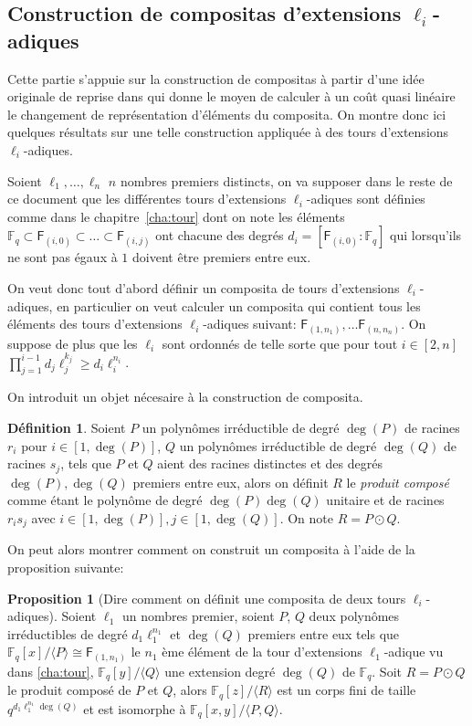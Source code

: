 \documentclass[10pt,a4paper]{book}
\theoremstyle{plain}
\theoremstyle{definition}
\theoremstyle{definition}
\theoremstyle{definition}
\newtheorem{prop}[thm]{Proposition}
\theoremstyle{definition}
\newtheorem{defi}[thm]{Définition}
\theoremstyle{remark}
\theoremstyle{remark}
\theoremstyle{definition}
\begin{document}
\subsection{Construction de compositas d'extensions $\ell_i$-adiques}
\label{sub:con:com}

Cette partie s'appuie sur la construction de compositas à partir d'une idée 
originale de \cite{BrawleyCarlitz87} reprise dans
\cite{DeFeoDoliskaniSchost14} qui donne le moyen de calculer à un coût quasi 
linéaire le changement de représentation d'éléments du composita. On montre 
donc ici quelques résultats sur une telle construction appliquée à des tours 
d'extensions $\ell_i$-adiques.

Soient $\ell_1, \dots, \ell_n$ $n$ nombres premiers distincts, 
on va supposer dans le reste de ce document que les différentes tours 
d'extensions $\ell_i$-adiques sont définies comme dans le 
chapitre~\ref{cha:tour} dont on note les éléments 
$\mathbb{F}_q \subset \mathsf{F}_{(i,0)} \subset \dots \subset  \mathsf{F}_{(i,j)}$ 
ont chacune des degrés $d_i=[\mathsf{F}_{(i,0)}:\mathbb{F}_q]$ qui lorsqu'ils 
ne sont pas égaux à $1$ doivent être premiers entre eux.

On veut donc tout d'abord définir un composita de tours d'extensions 
$\ell_i$-adiques, en particulier on veut calculer un composita qui contient 
tous les éléments des tours d'extensions $\ell_i$-adiques suivant:
$\mathsf{F}_{(1,n_1)}, \dots \mathsf{F}_{(n,n_n)}$. On suppose de plus que les
$\ell_i$ sont ordonnés de telle sorte que pour tout $i \in [2,n]$ 
$\prod_{j=1}^{i-1}d_j\ell_j^{k_j} \geqslant d_i\ell_i^{n_i}$.

On introduit un objet nécesaire à la construction de composita.
\begin{defi}
Soient $P$ un polynômes irréductible de degré $\deg(P)$ de racines $r_i$ pour 
$i \in [1,\deg(P)]$, $Q$ un polynômes irréductible de degré $\deg(Q)$ de racines $s_j$,
tels que $P$ et $Q$ aient des racines distinctes et des degrés $\deg(P),\deg(Q)$ 
premiers entre eux, alors on définit $R$ le \emph{produit composé} comme étant 
le polynôme de degré $\deg(P)\deg(Q)$ unitaire et de racines $r_is_j$ avec $i \in 
[1,\deg(P)], j \in [1,\deg(Q)]$. On note $R= P\odot Q$.  
\end{defi}
On peut alors montrer comment on construit un composita à l'aide de la 
proposition suivante: 
\begin{prop}[Dire comment on définit une composita de deux tours $\ell_i$-adiques]
\label{pro:init:com}
Soient $\ell_1$ un nombres premier, soient $P$, $Q$ deux 
polynômes irréductibles de degré $d_1\ell_1^{n_1}$ et $\deg(Q)$ 
premiers entre eux tels que $\mathbb{F}_q[x]/\langle P \rangle \cong 
\mathsf{F}_{(1,n_1)}$ le $n_1$ ème élément de la tour d'extensions 
$\ell_1$-adique vu dans \ref{cha:tour}, $\mathbb{F}_q[y]/\langle Q \rangle$ 
une extension degré $\deg(Q)$ de $\mathbb{F}_q$.
 Soit $R=P\odot Q$  le produit composé de $P$ et $Q$, alors 
 $\mathbb{F}_q[z]/\langle R \rangle$ est un corps fini de taille 
 $q^{d_1\ell_1^{n_1}\deg(Q)}$ et est isomorphe à $\mathbb{F}_q[x,y]/
 \langle P,Q \rangle$.
\end{prop}
\end{document}
